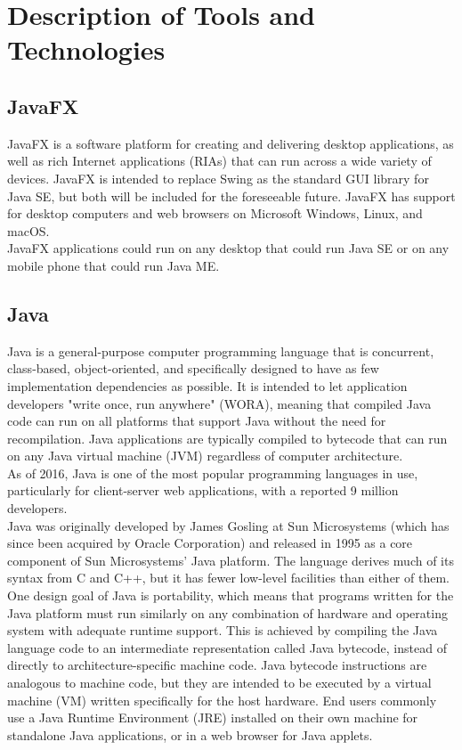 \chapter{Description of Tools and Technologies}

\section{JavaFX}
JavaFX is a software platform for creating and delivering desktop applications, as well as rich Internet applications (RIAs) that can run across a wide variety of devices. JavaFX is intended to replace Swing as the standard GUI library for Java SE, but both will be included for the foreseeable future. JavaFX has support for desktop computers and web browsers on Microsoft Windows, Linux, and macOS.\\

JavaFX applications could run on any desktop that could run Java SE or on any mobile phone that could run Java ME.

\thispagestyle{fancy}

\section{Java}
Java is a general-purpose computer programming language that is concurrent,
class-based, object-oriented, and specifically designed to have as few implementation dependencies as possible. It is intended to let application developers "write once, run anywhere" (WORA), meaning that compiled Java code can run on all platforms that support Java without the need for recompilation. Java applications are typically compiled to bytecode that can run on any Java virtual machine (JVM) regardless of computer architecture.\\

As of 2016, Java is one of the most popular programming languages in use, particularly for client-server web applications, with a reported 9 million developers.\\

Java was originally developed by James Gosling at Sun Microsystems (which has since been acquired by Oracle Corporation) and released in 1995 as a core component of Sun Microsystems' Java platform. The language derives much of its syntax from C and C++, but it has fewer low-level facilities
than either of them.\\

One design goal of Java is portability, which means that programs written for the Java platform must run similarly on any combination of hardware and operating system with adequate runtime support. This is achieved by compiling the Java language code to an intermediate representation called Java bytecode, instead of directly to architecture-specific
machine code. Java bytecode instructions are analogous to machine code, but they are intended to be executed by a virtual machine (VM) written specifically for the host hardware. End users commonly use a Java Runtime Environment (JRE) installed on their own machine for standalone Java applications, or in a web browser for Java applets.

